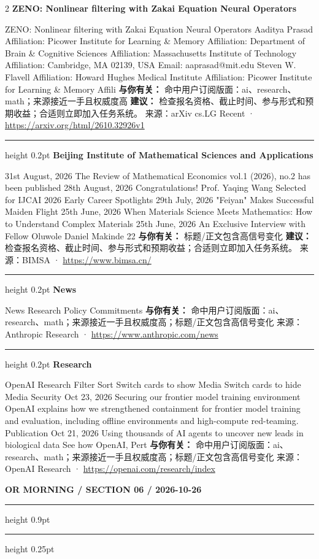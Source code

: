 \documentclass[10.5pt]{ctexart}
\begin{document}
\begin{multicols}{2}
{\large\bfseries ZENO: Nonlinear filtering with Zakai Equation Neural Operators}\par
ZENO: Nonlinear filtering with Zakai Equation Neural Operators Aaditya Prasad Affiliation: Picower Institute for Learning \& Memory Affiliation: Department of Brain \& Cognitive Sciences Affiliation: Massachusetts Institute of Technology Affiliation: Cambridge, MA 02139, USA Email: aaprasad@mit.edu Steven W. Flavell Affiliation: Howard Hughes Medical Institute Affiliation: Picower Institute for Learning \& Memory Affili
\textbf{与你有关：} 命中用户订阅版面：ai、research、math；来源接近一手且权威度高
\textbf{建议：} 检查报名资格、截止时间、参与形式和预期收益；合适则立即加入任务系统。
{\footnotesize\color{ormuted} 来源：arXiv cs.LG Recent · \url{https://arxiv.org/html/2610.32926v1}}
\vspace{2mm}
\hrule height 0.2pt
\vspace{2mm}
{\large\bfseries Beijing Institute of Mathematical Sciences and Applications}\par
31st August, 2026 The Review of Mathematical Economics vol.1 (2026), no.2 has been published 28th August, 2026 Congratulations! Prof. Yaqing Wang Selected for IJCAI 2026 Early Career Spotlights 29th July, 2026 "Feiyan" Makes Successful Maiden Flight 25th June, 2026 When Materials Science Meets Mathematics: How to Understand Complex Materials 25th June, 2026 An Exclusive Interview with Fellow Oluwole Daniel Makinde 22
\textbf{与你有关：} 标题/正文包含高信号变化
\textbf{建议：} 检查报名资格、截止时间、参与形式和预期收益；合适则立即加入任务系统。
{\footnotesize\color{ormuted} 来源：BIMSA · \url{https://www.bimsa.cn/}}
\vspace{2mm}
\hrule height 0.2pt
\vspace{2mm}
{\large\bfseries News}\par
News Research Policy Commitments
\textbf{与你有关：} 命中用户订阅版面：ai、research、math；来源接近一手且权威度高；标题/正文包含高信号变化
{\footnotesize\color{ormuted} 来源：Anthropic Research · \url{https://www.anthropic.com/news}}
\vspace{2mm}
\hrule height 0.2pt
\vspace{2mm}
{\large\bfseries Research}\par
OpenAI Research Filter Sort Switch cards to show Media Switch cards to hide Media Security Oct 23, 2026 Securing our frontier model training environment OpenAI explains how we strengthened containment for frontier model training and evaluation, including offline environments and high-compute red-teaming. Publication Oct 21, 2026 Using thousands of AI agents to uncover new leads in biological data See how OpenAI, Pert
\textbf{与你有关：} 命中用户订阅版面：ai、research、math；来源接近一手且权威度高；标题/正文包含高信号变化
{\footnotesize\color{ormuted} 来源：OpenAI Research · \url{https://openai.com/research/index}}
\end{multicols}
\newpage
{\small\bfseries OR MORNING / SECTION 06 / 2026-10-26}
\vspace{2mm}
\hrule height 0.9pt
\vspace{1.5mm}
\hrule height 0.25pt
\vspace{4mm}
\end{document}

